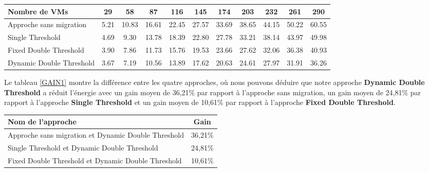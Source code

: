 \begin{onehalfspace}
\begin{center}
{\scriptsize   \begin{tabular}{|p{3.5cm}|c|c|c|c|c|c|c|c|c|c|}
\hline
      \centering     Nombre de VMs &  29& 58& 87& 116& 145& 174& 203& 232& 261& 290\\
\hline
     \centering       Approche sans migration &  5.21& 10.83& 16.61& 22.45& 27.57& 33.69& 38.65& 44.15& 50.22& 60.55\\
\hline
      \centering      Single Threshold &  4.69& 9.30& 13.78& 18.39& 22.80& 27.78& 33.21& 38.14& 43.97& 49.98\\
\hline
      \centering      Fixed Double Threshold &  3.90& 7.86& 11.73& 15.76& 19.53& 23.66& 27.62& 32.06& 36.38& 40.93\\
\hline
      \centering     Dynamic Double Threshold &  3.67& 7.19& 10.56& 13.89& 17.62& 20.63& 24.61& 27.97& 31.91& 36.26\\
\hline
\end{tabular}}
\label{tab2}
\end{center}


Le tableau \ref{GAIN1} montre la différence entre les quatre approches, où nous pouvons déduire que notre approche \textbf{Dynamic Double Threshold} a réduit l’énergie avec un gain moyen de 36,21\% par rapport à l'approche sans migration, un gain moyen de 24,81\% par rapport à l'approche \textbf{Single Threshold} et un gain moyen de 10,61\% par rapport à l'approche \textbf{Fixed Double Threshold}.\\


\begin{center}
{\scriptsize   \begin{tabular}{|p{3.5cm}|c|}
\hline
      \centering      Nom de l’approche &  Gain\\
\hline
     \centering       Approche sans migration et Dynamic Double Threshold &  36,21\%\\
\hline
      \centering      Single Threshold et Dynamic Double Threshold&  24,81\%\\
\hline
      \centering      Fixed Double Threshold et Dynamic Double Threshold&  10,61\%\\
\hline
\end{tabular}}
\label{GAIN1}
\end{center}




\end{onehalfspace}

